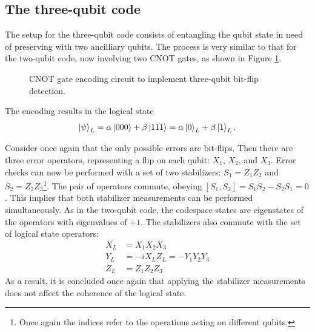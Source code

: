 \subsection{The three-qubit code}

The setup for the three-qubit code consists of entangling the qubit state in need of preserving with two ancilliary qubits. The process is very similar to that for the two-qubit code, now involving two CNOT gates, as shown in Figure \ref{fig:three_qub_enc}.
\begin{figure}
    \centering
    \caption{CNOT gate encoding circuit to implement three-qubit bit-flip detection.}
    \label{fig:three_qub_enc}
\end{figure}
The encoding results in the logical state
\begin{equation}
    \ket{\psi}_L = \alpha \ket{000} +\beta \ket{111}=\alpha \ket{0}_L +\beta \ket{1}_L.
\end{equation}

Consider once again that the only possible errors are bit-flips. Then there are three error operators, representing a flip on each qubit: $X_1$, $X_2$, and $X_3$. Error checks can now be performed with a set of two stabilizers: $S_1=Z_1Z_2$ and $S_2=Z_2Z_3$\footnote{Once again the indices refer to the operations acting on different qubits.}. The pair of operators commute, obeying $\left[S_1,S_2\right]=S_1S_2-S_2S_1=0$. This implies that both stabilizer measurements can be performed simultaneously. As in the two-qubit code, the codespace states are eigenstates of the operators with eigenvalues of $+1$. The stabilizers also commute with the set of logical state operators:
\begin{eqnarray}
    X_L&=X_1X_2X_3 \\
    Y_L&=-iX_LZ_L=-Y_1Y_2Y_3\\
    Z_L&=Z_1Z_2Z_3
\end{eqnarray}
As a result, it is concluded once again that applying the stabilizer measurements does not affect the coherence of the logical state.

